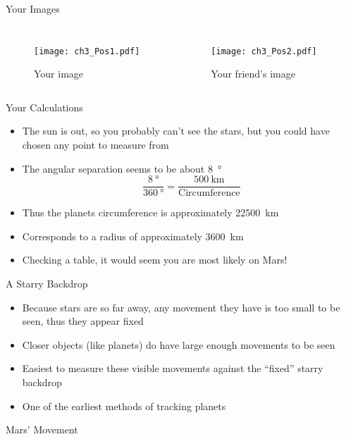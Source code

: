 \documentclass[pdf, aspectratio=169]{beamer}
\begin{document}
\begin{frame}{Your Images}
  \vspace{-5mm}
  \begin{columns}
	\begin{figure}[h!]
	  \centering
	  \texttt{[image: ch3\_Pos1.pdf]}
	  \caption*{Your image}
	\end{figure}
	\begin{figure}[h!]
	  \centering
	  \texttt{[image: ch3\_Pos2.pdf]}
	  \caption*{Your friend's image}
	\end{figure}
  \end{columns}
\end{frame}

\begin{frame}{Your Calculations}
  \begin{itemize}
	\item The sun is out, so you probably can't see the stars, but you could have chosen any point to measure from
	\item The angular separation seems to be about \SI{8}{\degree}
	  \[\frac{\SI{8}{\degree}}{\SI{360}{\degree}} = \frac{\SI{500}{\kilo\meter}}{\text{Circumference}}\]
	\item Thus the planets circumference is approximately \SI{22500}{\kilo\meter}
	\item Corresponds to a radius of approximately \SI{3600}{\kilo\meter}
	\item Checking a table, it would seem you are most likely on Mars!
  \end{itemize}
\end{frame}

\begin{frame}{A Starry Backdrop}
  \begin{itemize}
	\item Because stars are so far away, any movement they have is too small to be seen, thus they appear fixed
	\item Closer objects (like planets) do have large enough movements to be seen
	\item Easiest to measure these visible movements against the ``fixed'' starry backdrop
	\item One of the earliest methods of tracking planets
  \end{itemize}
\end{frame}

\begin{frame}{Mars' Movement}
  \begin{center}
  \end{center}
\end{frame}
\end{document}
